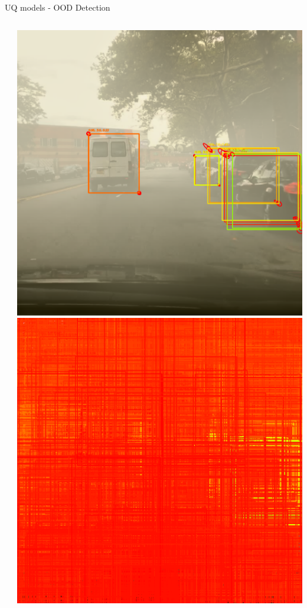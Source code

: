 \documentclass[10pt, aspectratio=169]{beamer}
\begin{document}
\begin{frame}[allowframebreaks]{UQ models - OOD Detection}
\begin{columns}
\begin{column}{.2\textwidth}
            \end{column}
            \begin{column}{.2\textwidth}
                \includegraphics[width=\textwidth]{images/uq_weathers/SubEns_Variance3.png}
                \includegraphics[width=\textwidth]{images/uq_weathers/SubEns_entropies_all3.png}

\end{column}
\end{columns}
\end{frame}
\end{document}
